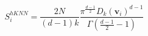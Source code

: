 \begin{equation}
\label{eq:ad_knn_h}
S_i^{hKNN} = \frac{2N}{(d-1)k}\frac{\pi^{\frac{d-1}{2}}D_{k}(\bm{v}_i)^{d-1}}{\Gamma\left(\frac{d-1}{2} - 1\right)}
\end{equation}

